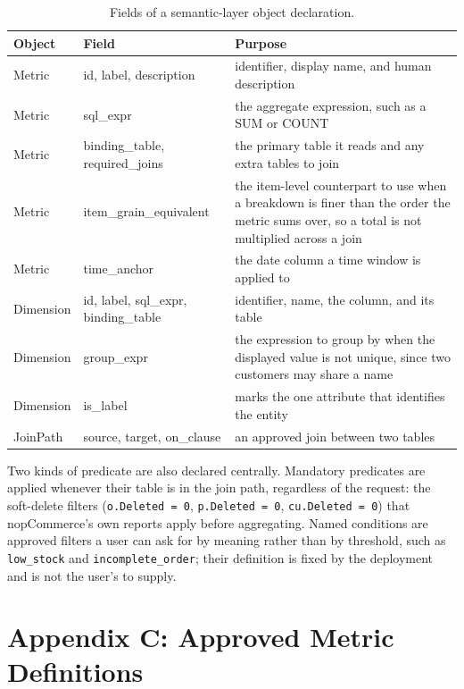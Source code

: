 \documentclass[pdflatex,sn-mathphys-num]{sn-jnl}
\begin{document}
\begin{table}[t]
\caption{Fields of a semantic-layer object declaration.}
\label{tab:10}
\centering
\renewcommand{\arraystretch}{1.15}
\begin{tabular}{lp{}p{}}
\toprule
Object & Field & Purpose \\
\midrule
Metric & id, label, description & identifier, display name, and human description \\
Metric & sql\_expr & the aggregate expression, such as a SUM or COUNT \\
Metric & binding\_table, required\_joins & the primary table it reads and any extra tables to join \\
Metric & item\_grain\_equivalent & the item-level counterpart to use when a breakdown is finer than the order the metric sums over, so a total is not multiplied across a join \\
Metric & time\_anchor & the date column a time window is applied to \\
Dimension & id, label, sql\_expr, binding\_table & identifier, name, the column, and its table \\
Dimension & group\_expr & the expression to group by when the displayed value is not unique, since two customers may share a name \\
Dimension & is\_label & marks the one attribute that identifies the entity \\
JoinPath & source, target, on\_clause & an approved join between two tables \\
\bottomrule
\end{tabular}
\end{table}

Two kinds of predicate are also declared centrally. Mandatory predicates are applied whenever their table is in the join path, regardless of the request: the soft-delete filters (\texttt{o.Deleted = 0}, \texttt{p.Deleted = 0}, \texttt{cu.Deleted = 0}) that nopCommerce's own reports apply before aggregating. Named conditions are approved filters a user can ask for by meaning rather than by threshold, such as \texttt{low\_stock} and \texttt{incomplete\_order}; their definition is fixed by the deployment and is not the user's to supply.


\section{Appendix C: Approved Metric Definitions}
\end{document}
